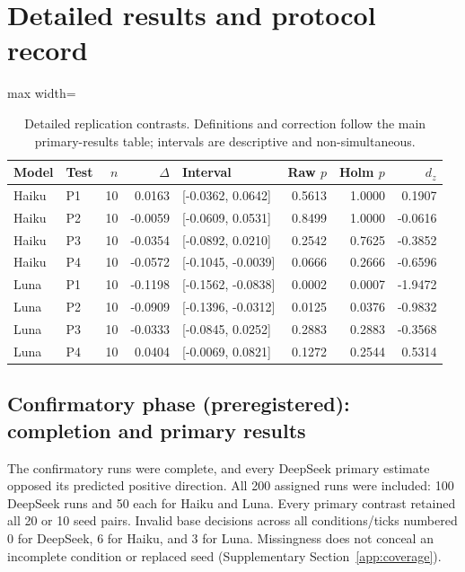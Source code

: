 \documentclass[a4paper]{article}
\begin{document}
\section{Detailed results and protocol record}\label{supp:results}
\begin{table}[tbp]
\caption{Detailed replication contrasts. Definitions and correction follow the main primary-results table; intervals are descriptive and non-simultaneous.}
\label{tab:replications}
\centering\small
\begin{adjustbox}{max width=\linewidth}
\begin{tabular}{llrrlrrr}
\toprule
Model & Test & $n$ & $\Delta$ & Interval & Raw $p$ & Holm $p$ & $d_z$ \\
\midrule
Haiku & P1 & 10 & 0.0163 & [-0.0362, 0.0642] & 0.5613 & 1.0000 & 0.1907 \\
Haiku & P2 & 10 & -0.0059 & [-0.0609, 0.0531] & 0.8499 & 1.0000 & -0.0616 \\
Haiku & P3 & 10 & -0.0354 & [-0.0892, 0.0210] & 0.2542 & 0.7625 & -0.3852 \\
Haiku & P4 & 10 & -0.0572 & [-0.1045, -0.0039] & 0.0666 & 0.2666 & -0.6596 \\
Luna & P1 & 10 & -0.1198 & [-0.1562, -0.0838] & 0.0002 & 0.0007 & -1.9472 \\
Luna & P2 & 10 & -0.0909 & [-0.1396, -0.0312] & 0.0125 & 0.0376 & -0.9832 \\
Luna & P3 & 10 & -0.0333 & [-0.0845, 0.0252] & 0.2883 & 0.2883 & -0.3568 \\
Luna & P4 & 10 & 0.0404 & [-0.0069, 0.0821] & 0.1272 & 0.2544 & 0.5314 \\
\bottomrule
\end{tabular}
\end{adjustbox}
\end{table}

\subsection{Confirmatory phase (preregistered): completion and primary results}\label{sec:primary}
The confirmatory runs were complete, and every DeepSeek primary estimate opposed its predicted positive direction. All 200 assigned runs were included: 100 DeepSeek runs and 50 each for Haiku and Luna. Every primary contrast retained all 20 or 10 seed pairs. Invalid base decisions across all conditions/ticks numbered 0 for DeepSeek, 6 for Haiku, and 3 for Luna. Missingness does not conceal an incomplete condition or replaced seed (Supplementary Section~\ref{app:coverage}).
\end{document}
